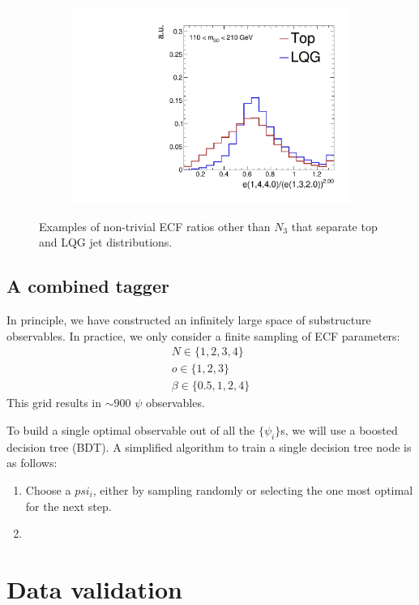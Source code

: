\begin{figure}[]
\begin{center}
\begin{subfigure}[t]{0.32\textwidth}
            \includegraphics[width=\textwidth]{figures/toptagging/shapes/mass_ratio_14401320.pdf}
        \end{subfigure}
        \caption{Examples of non-trivial ECF ratios other than $N_3$ that separate top and LQG jet distributions.}
        \label{fig:jets:ecfrs}
    \end{center}
\end{figure}


\subsection{A combined tagger}
\label{sec:jets:bdt}

In principle, we have constructed an infinitely large space of substructure observables.
In practice, we only consider a finite sampling of ECF parameters:
\begin{gather}
    N \in \{1,2,3,4\} \nonumber \\ 
    o \in \{1,2,3\} \nonumber \\ 
    \beta \in \{0.5, 1, 2, 4\}
\end{gather}
This grid results in $\sim900$ $\psi$ observables.

To build a single optimal observable out of all the $\{\psi_i\}$s, we will use a boosted decision tree (BDT).
A simplified algorithm to train a single decision tree node is as follows:
\begin{enumerate}
    \item Choose a $psi_i$, either by sampling randomly or selecting the one most optimal for the next step.
    \item 
\end{enumerate}


\section{Data validation}
\label{sec:jets:sf}
